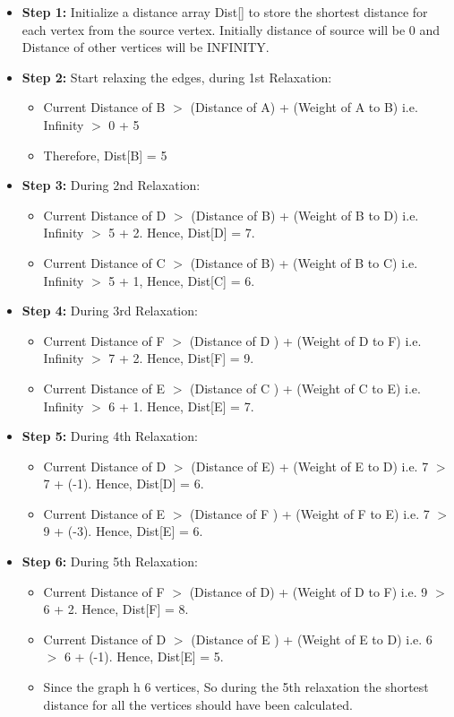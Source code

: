 \documentclass[lettersize,journal]{IEEEtran}
\begin{document}
\begin{itemize}
    \item {\textbf{Step 1:} Initialize a distance array Dist[] to store the shortest distance for each vertex from the source vertex. Initially distance of source will be 0 and Distance of other vertices will be INFINITY.}

    
    \item {\textbf{Step 2:} Start relaxing the edges, during 1st Relaxation: 
    \begin{itemize}
        \item {Current Distance of B \(>\) (Distance of A) + (Weight of A to B) i.e. Infinity \(>\) 0 + 5}
        \item {Therefore, Dist[B] = 5}
    \end{itemize}
    }
    \item {\textbf{Step 3:} During 2nd Relaxation:}
    \begin{itemize}
        \item {Current Distance of D \(>\) (Distance of B) + (Weight of B to D) i.e. Infinity \(>\) 5 + 2. Hence, Dist[D] = 7.}
        \item {Current Distance of C \(>\) (Distance of B) + (Weight of B to C) i.e. Infinity \(>\) 5 + 1, Hence, Dist[C] = 6.}
    \end{itemize}
    \item {\textbf{Step 4:} During 3rd Relaxation:}
    \begin{itemize}
        \item {Current Distance of F \(>\) (Distance of D ) + (Weight of D to F) i.e. Infinity \(>\) 7 + 2. Hence, Dist[F] = 9.}
        \item {Current Distance of E \(>\) (Distance of C ) + (Weight of C to E) i.e. Infinity \(>\) 6 + 1. Hence, Dist[E] = 7.}
    \end{itemize}

    \item {\textbf{Step 5:} During 4th Relaxation:}
    \begin{itemize}
        \item {Current Distance of D \(>\) (Distance of E) + (Weight of E to D) i.e. 7 \(>\) 7 + (-1). Hence, Dist[D] = 6.}
        \item {Current Distance of E \(>\) (Distance of F ) + (Weight of F to E) i.e. 7 \(>\) 9 + (-3). Hence, Dist[E] = 6.}
    \end{itemize}

    \item {\textbf{Step 6:} During 5th Relaxation:}
    \begin{itemize}
        \item {Current Distance of F \(>\) (Distance of D) + (Weight of D to F) i.e. 9 \(>\) 6 + 2. Hence, Dist[F] = 8.}
        \item {Current Distance of D \(>\) (Distance of E ) + (Weight of E to D) i.e. 6 \(>\) 6 + (-1). Hence, Dist[E] = 5.}
        \item {Since the graph h 6 vertices, So during the 5th relaxation the shortest distance for all the vertices should have been calculated.}
    \end{itemize}


\end{itemize}
\end{document}
